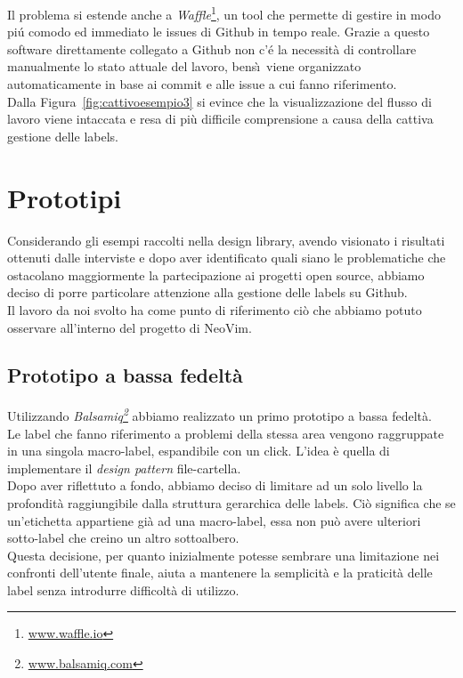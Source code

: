 \documentclass[12pt]{article} %
\begin{document}
Il problema si estende anche a \emph{Waffle}\footnote{\url{www.waffle.io}}, un tool che permette di gestire in modo pi\'u comodo ed immediato le issues di Github in tempo reale. Grazie a questo software direttamente collegato a Github non c'\'e la necessit\`a di controllare manualmente lo stato attuale del lavoro, bens\`\i\ viene organizzato automaticamente in base ai commit e alle issue a cui fanno riferimento.\\
Dalla Figura~\ref{fig:cattivoesempio3} si evince che la visualizzazione del flusso di lavoro viene intaccata e resa di pi\`u difficile comprensione a causa della cattiva gestione delle labels.

\newpage

\section{Prototipi}
Considerando gli esempi raccolti nella design library, avendo visionato i risultati ottenuti dalle interviste e dopo aver identificato quali siano le problematiche che ostacolano maggiormente la partecipazione ai progetti open source, abbiamo deciso di porre particolare attenzione alla gestione delle labels su Github.\\
Il lavoro da noi svolto ha come punto di riferimento ci\`o che abbiamo potuto osservare all'interno del progetto di NeoVim.\\

\subsection{Prototipo a bassa fedelt\`a}
Utilizzando \emph{Balsamiq\footnote{\url{www.balsamiq.com}}} abbiamo realizzato un primo prototipo a bassa fedelt\`a.\\
Le label che fanno riferimento a problemi della stessa area vengono raggruppate in una singola macro-label, espandibile con un click. L'idea \`e quella di implementare il \emph{design pattern} file-cartella.\\
Dopo aver riflettuto a fondo, abbiamo deciso di limitare ad un solo livello la profondit\`a raggiungibile dalla struttura gerarchica delle labels. Ci\`o significa che se un'etichetta appartiene gi\`a ad una macro-label, essa non pu\`o avere ulteriori sotto-label che creino un altro sottoalbero.\\
Questa decisione, per quanto inizialmente potesse sembrare una limitazione nei confronti dell'utente finale, aiuta a mantenere la semplicit\`a e la praticit\`a delle label senza introdurre difficolt\`a di utilizzo.
\end{document}
